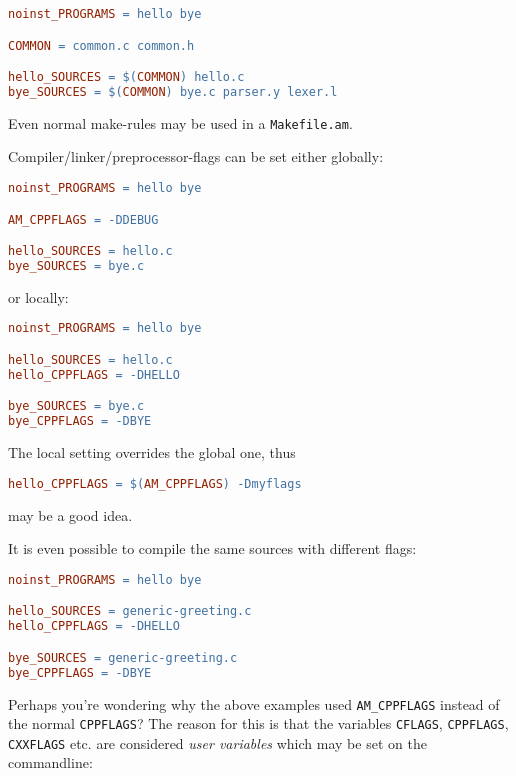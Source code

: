 \documentclass[11pt,a4paper,headinclude,footinclude,DIV16,normalheadings]{scrartcl}
\newcommand{\makefileam}{\texttt{Makefile.am}\xspace}
\begin{document}
\begin{lstlisting}[language=make]
noinst_PROGRAMS = hello bye

COMMON = common.c common.h

hello_SOURCES = $(COMMON) hello.c
bye_SOURCES = $(COMMON) bye.c parser.y lexer.l
\end{lstlisting}

Even normal make-rules may be used in a \makefileam.


Compiler/linker/preprocessor-flags can be set either globally:

\begin{lstlisting}[language=make]
noinst_PROGRAMS = hello bye

AM_CPPFLAGS = -DDEBUG

hello_SOURCES = hello.c
bye_SOURCES = bye.c
\end{lstlisting}

or locally:

\begin{lstlisting}[language=make]
noinst_PROGRAMS = hello bye

hello_SOURCES = hello.c
hello_CPPFLAGS = -DHELLO

bye_SOURCES = bye.c
bye_CPPFLAGS = -DBYE
\end{lstlisting}

The local setting overrides the global one, thus

\begin{lstlisting}[language=make]
hello_CPPFLAGS = $(AM_CPPFLAGS) -Dmyflags
\end{lstlisting}

may be a good idea.

It is even possible to compile the same sources with different flags:

\begin{lstlisting}[language=make]
noinst_PROGRAMS = hello bye

hello_SOURCES = generic-greeting.c
hello_CPPFLAGS = -DHELLO

bye_SOURCES = generic-greeting.c
bye_CPPFLAGS = -DBYE
\end{lstlisting}

Perhaps you're wondering why the above examples used
\texttt{AM\_CPPFLAGS} instead of the normal \texttt{CPPFLAGS}? The
reason for this is that the variables \texttt{CFLAGS},
\texttt{CPPFLAGS}, \texttt{CXXFLAGS} etc. are considered {\em user
  variables} which may be set on the commandline:
\end{document}
